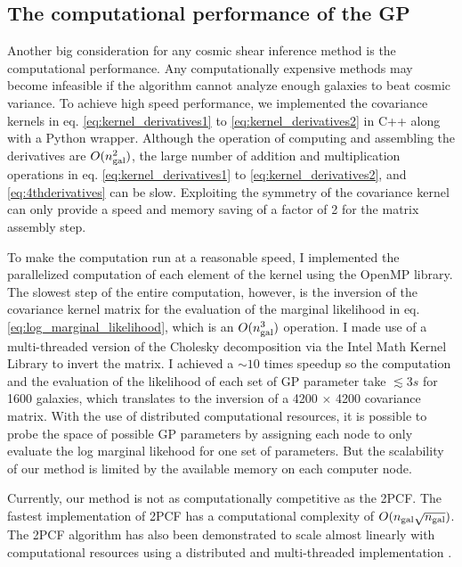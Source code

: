 \subsection{The computational performance of the GP}
\label{subsec:computational_performance}
Another big consideration for any cosmic shear inference method is the computational performance.
Any
computationally expensive methods may become infeasible if the algorithm cannot 
analyze enough galaxies to beat cosmic variance. 
To achieve high speed performance, we  
implemented the covariance kernels in eq. \ref{eq:kernel_derivatives1} to
\ref{eq:kernel_derivatives2}
in {\sc C++} along with a {\sc Python} wrapper. 
Although the operation of computing and assembling the
derivatives are $O(n_{\rm gal}^2)$, the large number of addition and 
multiplication operations in eq. \ref{eq:kernel_derivatives1} to
\ref{eq:kernel_derivatives2}, and \ref{eq:4thderivatives} can be slow.
Exploiting the symmetry of the covariance kernel can only provide 
a speed and memory saving of a factor of 2 for the matrix assembly step.

To make the computation run at a reasonable speed, 
I implemented the parallelized computation of each element of the kernel using 
the {\sc OpenMP} library. The slowest step of the entire computation, however, 
is the inversion of the
covariance kernel matrix for the evaluation of the marginal likelihood in eq.
\ref{eq:log_marginal_likelihood}, 
which is an $O(n_{\rm gal}^3)$ operation. 
I made use of a multi-threaded version of the Cholesky decomposition via the {\sc Intel Math
Kernel Library} to invert the matrix. I achieved a $\sim10$ 
times speedup so the computation and the evaluation of the likelihood of each set of GP parameter
take $\lesssim 3s$ for 1600 galaxies, which translates to 
the inversion of a 4200 $\times$ 4200 covariance matrix.
With the use of distributed computational resources, it is possible 
to probe the space of possible GP parameters by assigning each node to only
evaluate the log marginal likehood for one set of parameters. 
But the scalability of our method is limited by the available memory on each
computer node.

Currently, our method is not as computationally competitive as the 2PCF. 
The fastest implementation of 2PCF has a computational complexity of
$O(n_{\rm gal}\sqrt{n_{\rm gal}})$.
The 2PCF algorithm has also been demonstrated to scale almost linearly with
computational resources 
using a distributed and multi-threaded implementation \citep{Chhugani2012}. 

